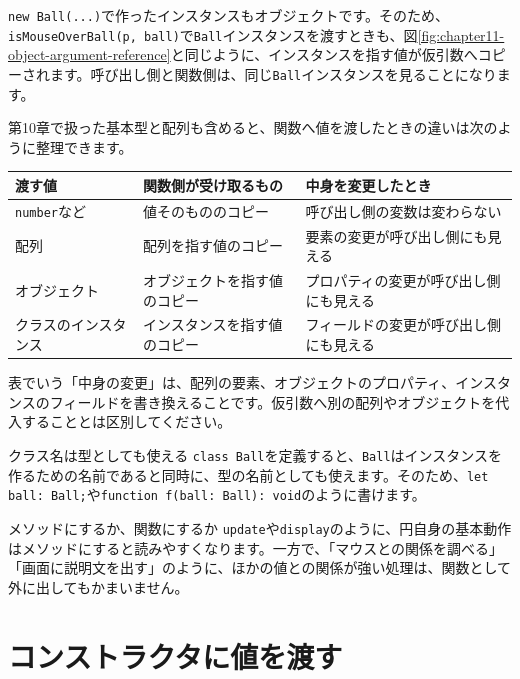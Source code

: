 \texttt{new Ball(...)}で作ったインスタンスもオブジェクトです。そのため、\texttt{isMouseOverBall(p, ball)}で\texttt{Ball}インスタンスを渡すときも、図\ref{fig:chapter11-object-argument-reference}と同じように、インスタンスを指す値が仮引数へコピーされます。呼び出し側と関数側は、同じ\texttt{Ball}インスタンスを見ることになります。

第10章で扱った基本型と配列も含めると、関数へ値を渡したときの違いは次のように整理できます。

\begin{center}
\begin{tabular}{p{28mm}p{46mm}p{58mm}}
\toprule
渡す値 & 関数側が受け取るもの & 中身を変更したとき \\
\midrule
\texttt{number}など & 値そのもののコピー & 呼び出し側の変数は変わらない \\
配列 & 配列を指す値のコピー & 要素の変更が呼び出し側にも見える \\
オブジェクト & オブジェクトを指す値のコピー & プロパティの変更が呼び出し側にも見える \\
クラスのインスタンス & インスタンスを指す値のコピー & フィールドの変更が呼び出し側にも見える \\
\bottomrule
\end{tabular}
\end{center}

表でいう「中身の変更」は、配列の要素、オブジェクトのプロパティ、インスタンスのフィールドを書き換えることです。仮引数へ別の配列やオブジェクトを代入することとは区別してください。

\begin{pointbox}{クラス名は型としても使える}
\texttt{class Ball}を定義すると、\texttt{Ball}はインスタンスを作るための名前であると同時に、型の名前としても使えます。そのため、\texttt{let ball: Ball;}や\texttt{function f(ball: Ball): void}のように書けます。
\end{pointbox}

\begin{notebox}{メソッドにするか、関数にするか}
\texttt{update}や\texttt{display}のように、円自身の基本動作はメソッドにすると読みやすくなります。一方で、「マウスとの関係を調べる」「画面に説明文を出す」のように、ほかの値との関係が強い処理は、関数として外に出してもかまいません。
\end{notebox}

\section{コンストラクタに値を渡す}

